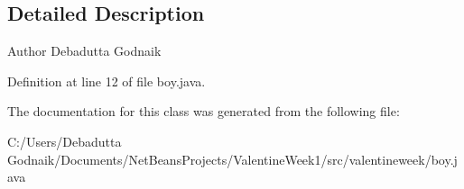 \subsection{Detailed Description}
\begin{DoxyAuthor}{Author}
Debadutta Godnaik 
\end{DoxyAuthor}


Definition at line 12 of file boy.\+java.



The documentation for this class was generated from the following file\+:\begin{DoxyCompactItemize}
\item 
C\+:/\+Users/\+Debadutta Godnaik/\+Documents/\+Net\+Beans\+Projects/\+Valentine\+Week1/src/valentineweek/boy.\+java\end{DoxyCompactItemize}
